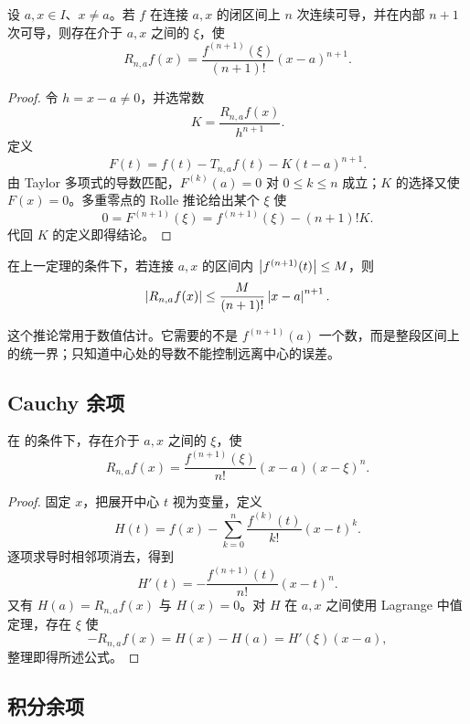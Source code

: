 \begin{theorem}
\label{thm:taylor-lagrange}
设 \(a,x\in I\)、\(x\ne a\)。若 \(f\) 在连接 \(a,x\) 的闭区间上 \(n\) 次连续可导，并在内部 \(n+1\) 次可导，则存在介于 \(a,x\) 之间的 \(\xi\)，使
\[
 R_{n,a}f(x)
 =\frac{f^{(n+1)}(\xi)}{(n+1)!}(x-a)^{n+1}.
\]
\end{theorem}

\begin{proof}
令 \(h=x-a\ne0\)，并选常数
\[
 K=\frac{R_{n,a}f(x)}{h^{n+1}}.
\]
定义
\[
 F(t)=f(t)-T_{n,a}f(t)-K(t-a)^{n+1}.
\]
由 Taylor 多项式的导数匹配，\(F^{(k)}(a)=0\) 对 \(0\le k\le n\) 成立；\(K\) 的选择又使 \(F(x)=0\)。多重零点的 Rolle 推论给出某个 \(\xi\) 使
\[
 0=F^{(n+1)}(\xi)=f^{(n+1)}(\xi)-(n+1)!K.
\]
代回 \(K\) 的定义即得结论。
\end{proof}

\begin{corollary}[一致误差估计]
在上一定理的条件下，若连接 \(a,x\) 的区间内
\(\left|f^{(n+1)}(t)\right|\le M\)，则
\[
 \left|R_{n,a}f(x)\right|
 \le\frac{M}{(n+1)!}\left|x-a\right|^{n+1}.
\]
\end{corollary}

这个推论常用于数值估计。它需要的不是 \(f^{(n+1)}(a)\) 一个数，而是整段区间上的统一界；只知道中心处的导数不能控制远离中心的误差。

\subsection{Cauchy 余项}

\begin{theorem}
在  的条件下，存在介于 \(a,x\) 之间的 \(\xi\)，使
\[
 R_{n,a}f(x)
 =\frac{f^{(n+1)}(\xi)}{n!}(x-a)(x-\xi)^n.
\]
\end{theorem}

\begin{proof}
固定 \(x\)，把展开中心 \(t\) 视为变量，定义
\[
 H(t)=f(x)-\sum_{k=0}^{n}\frac{f^{(k)}(t)}{k!}(x-t)^k.
\]
逐项求导时相邻项消去，得到
\[
 H'(t)=-\frac{f^{(n+1)}(t)}{n!}(x-t)^n.
\]
又有 \(H(a)=R_{n,a}f(x)\) 与 \(H(x)=0\)。对 \(H\) 在 \(a,x\) 之间使用 Lagrange 中值定理，存在 \(\xi\) 使
\[
 -R_{n,a}f(x)=H(x)-H(a)=H'(\xi)(x-a),
\]
整理即得所述公式。
\end{proof}

\subsection{积分余项}

